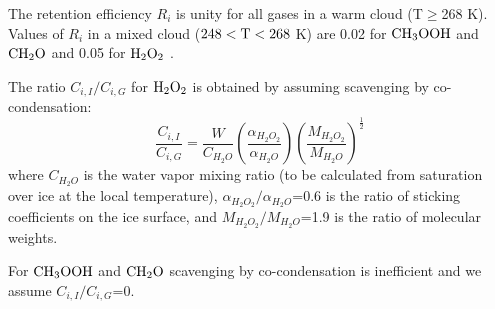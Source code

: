 The retention efficiency $R_i$ is unity for all gases in a warm cloud
(T$\ge$268 K). Values of $R_i$ in a mixed cloud 
($\rm 248 < T < 268$ K) are 0.02 for $\rm CH_3OOH$ and $\rm CH_2O$ and 0.05 for $\rm H_2O_2$ \citep{Mari2000}.

The ratio $C_{i,I}/C_{i,G}$ for $\rm H_2O_2$ is obtained by assuming scavenging
by co-condensation: 
$$
\frac{C_{i,I}}{C_{i,G}}=
\frac{W}{C_{H_2O}}
\left( \frac{\alpha_{H_2O_2}}{\alpha_{H_2O}} \right) 
\left( \frac{M_{H_2O_2}}{M_{H_2O}} \right) ^{\frac{1}{2}}
$$
where $C_{H_2O}$ is the water vapor mixing ratio (to be calculated from 
saturation over ice at the local temperature), $\alpha_{H_2O_2}/\alpha_{H_2O}$=0.6 is the ratio of sticking coefficients on the ice surface, and $M_{H_2O_2}/M_{H_2O}$=1.9 is the ratio of molecular weights. 

For $\rm CH_3OOH$ and $\rm CH_2O$ scavenging by co-condensation is inefficient
and we assume $C_{i,I}/C_{i,G}$=0.

